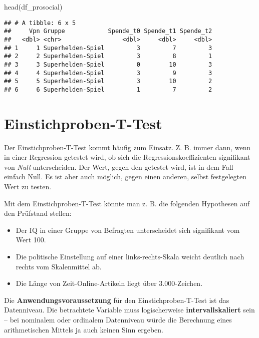 \documentclass[
]{book}
\newenvironment{Shaded}{\begin{snugshade}}{\end{snugshade}}
\newcommand{\FunctionTok}[1]{\textcolor[rgb]{0.00,0.00,0.00}{#1}}
\newcommand{\NormalTok}[1]{#1}
\begin{document}
\begin{Shaded}
\begin{Highlighting}[]
\FunctionTok{head}\NormalTok{(df\_prosocial)}
\end{Highlighting}
\end{Shaded}

\begin{verbatim}
## # A tibble: 6 x 5
##     Vpn Gruppe            Spende_t0 Spende_t1 Spende_t2
##   <dbl> <chr>                 <dbl>     <dbl>     <dbl>
## 1     1 Superhelden-Spiel         3         7         3
## 2     2 Superhelden-Spiel         3         8         1
## 3     3 Superhelden-Spiel         0        10         3
## 4     4 Superhelden-Spiel         3         9         3
## 5     5 Superhelden-Spiel         3        10         2
## 6     6 Superhelden-Spiel         1         7         2
\end{verbatim}

\hypertarget{einstichproben-t-test}{%
\section{Einstichproben-T-Test}\label{einstichproben-t-test}}

Der Einstichproben-T-Test kommt häufig zum Einsatz. Z. B. immer dann, wenn in einer Regression getestet wird, ob sich die Regressionskoeffizienten signifikant von \emph{Null} unterscheiden.
Der Wert, gegen den getestet wird, ist in dem Fall einfach Null.
Es ist aber auch möglich, gegen einen anderen, selbst festgelegten Wert zu testen.

Mit dem Einstichproben-T-Test könnte man z. B. die folgenden Hypothesen auf den Prüfstand stellen:

\begin{itemize}
\item
  Der IQ in einer Gruppe von Befragten unterscheidet sich signifikant vom Wert 100.
\item
  Die politische Einstellung auf einer links-rechts-Skala weicht deutlich nach rechts vom Skalenmittel ab.
\item
  Die Länge von Zeit-Online-Artikeln liegt über 3.000-Zeichen.
\end{itemize}

Die \textbf{Anwendungsvoraussetzung} für den Einstichproben-T-Test ist das Datenniveau. Die betrachtete Variable muss logischerweise \textbf{intervallskaliert} sein -- bei nominalem oder ordinalem Datenniveau würde die Berechnung eines arithmetischen Mittels ja auch keinen Sinn ergeben.
\end{document}
